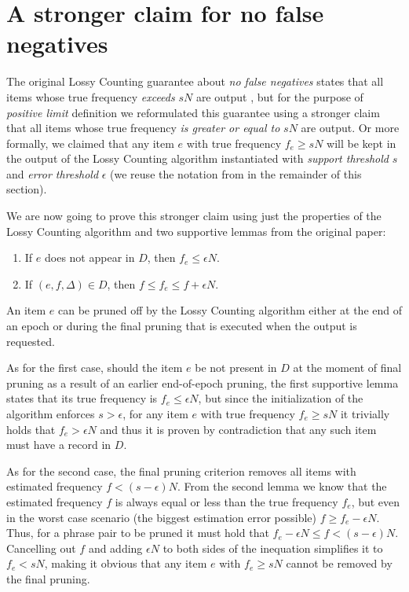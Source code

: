 \section{A stronger claim for no false negatives}
\label{sec:positive-limit-validity}

The original Lossy Counting guarantee about \emph{no false negatives} states that all items
whose true frequency \emph{exceeds} $sN$ are output \citep[p. 3]{manku:lossycounting}, but
for the purpose of \emph{positive limit} definition we reformulated this guarantee using
a stronger claim that all items whose true frequency \emph{is greater or equal to} $sN$ are
output. Or more formally, we claimed that any item $e$ with true frequency $f_{e} \geq sN$
will be kept in the output of the Lossy Counting algorithm instantiated with
\emph{support threshold} $s$ and \emph{error threshold} $\epsilon$
(we reuse the notation from  in the remainder of this section).

We are now going to prove this stronger claim using just the properties of the Lossy Counting
algorithm and two supportive lemmas from the original paper:
\begin{enumerate}
  \item If $e$ does not appear in $D$, then $f_{e} \leq \epsilon N$.
  \item If $(e,f,\Delta) \in D$, then $f \leq f_{e} \leq f + \epsilon N$.
\end{enumerate}

An item $e$ can be pruned off by the Lossy Counting algorithm either at the end of an epoch or
during the final pruning that is executed when the output is requested.

As for the first case, should the item $e$ be not present in $D$ at the moment of final
pruning as a result of an earlier end-of-epoch pruning, the first supportive lemma states
that its true frequency is $f_e \leq \epsilon N$, but since the initialization of the algorithm
enforces $s > \epsilon$, for any item $e$ with true frequency $f_{e} \geq sN$ it trivially
holds that $f_{e} > \epsilon N$ and thus it is proven by contradiction that any such item
must have a record in $D$.

As for the second case, the final pruning criterion removes all items with estimated frequency
$f < (s - \epsilon)N$. From the second lemma we know that the estimated frequency $f$ is always
equal or less than the true frequency $f_{e}$, but even in the worst case scenario (the biggest
estimation error possible) $f \geq f_{e} - \epsilon N$.
Thus, for a phrase pair to be pruned it must hold that $f_{e} - \epsilon N \leq f < (s - \epsilon) N$.
Cancelling out $f$ and adding $\epsilon N$ to both sides of the inequation simplifies it to $f_{e} < sN$,
making it obvious that any item $e$ with $f_{e} \geq sN$ cannot be removed by the final pruning.

